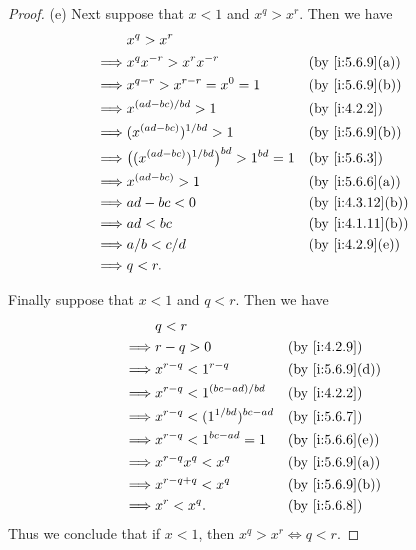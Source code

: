 \begin{proof}{(e)}
  Next suppose that \(x < 1\) and \(x^q > x^r\).
  Then we have
  \begin{align*}
             & x^q > x^r                                                                  \\
    \implies & x^q x^{-r} > x^r x^{-r}                              &  & \by{i:5.6.9}[a]  \\
    \implies & x^{q - r} > x^{r - r} = x^0 = 1                      &  & \by{i:5.6.9}[b]  \\
    \implies & x^{(ad - bc) / bd} > 1                               &  & \by{i:4.2.2}     \\
    \implies & (x^{(ad - bc)})^{1 / bd} > 1                         &  & \by{i:5.6.9}[b]  \\
    \implies & \big((x^{(ad - bc)})^{1 / bd}\big)^{bd} > 1^{bd} = 1 &  & \by{i:5.6.3}     \\
    \implies & x^{(ad - bc)} > 1                                    &  & \by{i:5.6.6}[a]  \\
    \implies & ad - bc < 0                                          &  & \by{i:4.3.12}[b] \\
    \implies & ad < bc                                              &  & \by{i:4.1.11}[b] \\
    \implies & a / b < c / d                                        &  & \by{i:4.2.9}[e]  \\
    \implies & q < r.
  \end{align*}

  Finally suppose that \(x < 1\) and \(q < r\).
  Then we have
  \begin{align*}
             & q < r                                                   \\
    \implies & r - q > 0                          &  & \by{i:4.2.9}    \\
    \implies & x^{r - q} < 1^{r - q}              &  & \by{i:5.6.9}[d] \\
    \implies & x^{r - q} < 1^{(bc - ad) / bd}     &  & \by{i:4.2.2}    \\
    \implies & x^{r - q} < (1^{1 / bd})^{bc - ad} &  & \by{i:5.6.7}    \\
    \implies & x^{r - q} < 1^{bc - ad} = 1        &  & \by{i:5.6.6}[e] \\
    \implies & x^{r - q} x^q < x^q                &  & \by{i:5.6.9}[a] \\
    \implies & x^{r - q + q} < x^q                &  & \by{i:5.6.9}[b] \\
    \implies & x^r < x^q.                         &  & \by{i:5.6.8}
  \end{align*}
  Thus we conclude that if \(x < 1\), then \(x^q > x^r \iff q < r\).
\end{proof}

